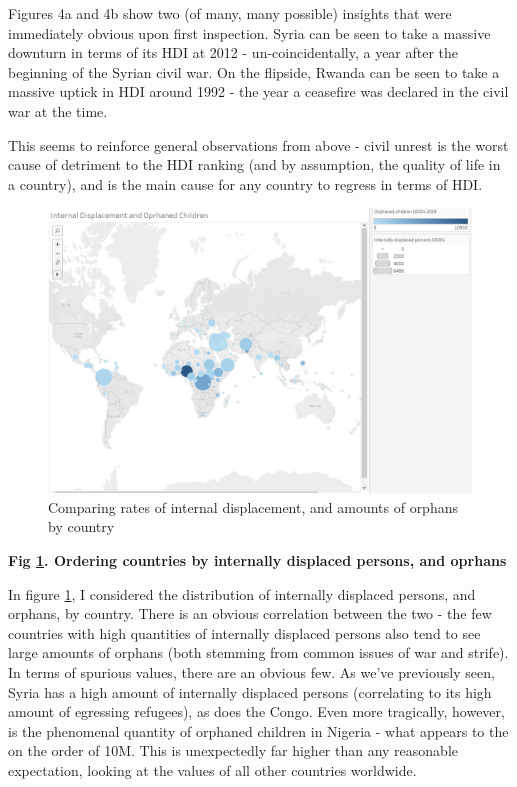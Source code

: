 \documentclass[ 10pt ]{fphw}
\begin{document}
Figures 4a and 4b show two (of many, many possible) insights that were immediately obvious upon first inspection. Syria can be seen to take a massive downturn in terms of its HDI at 2012 - un-coincidentally, a year after the beginning of the Syrian civil war. On the flipside, Rwanda can be seen to take a massive uptick in HDI around 1992 - the year a ceasefire was declared in the civil war at the time. 

This seems to reinforce general observations from above - civil unrest is the worst cause of detriment to the HDI ranking (and by assumption, the quality of life in a country), and is the main cause for any country to regress in terms of HDI.


\hfill \break  

\begin{figure}[H]
    \centering
    \includegraphics[width=\columnwidth]{orphans.PNG} 
    \caption{Comparing rates of internal displacement, and amounts of orphans by country}
    \label{fig:orphans}
\end{figure}

\textbf{Fig \ref{fig:orphans}. Ordering countries by internally displaced persons, and oprhans} 

\vspace{0.25cm}

In figure \ref{fig:orphans}, I considered the distribution of internally displaced persons, and orphans, by country. There is an obvious correlation between the two - the few countries with high quantities of internally displaced persons also tend to see large amounts of orphans (both stemming from common issues of war and strife). In terms of spurious values, there are an obvious few. As we've previously seen, Syria has a high amount of internally displaced persons (correlating to its high amount of egressing refugees), as does the Congo. Even more tragically, however, is the phenomenal quantity of orphaned children in Nigeria - what appears to the on the order of 10M. This is unexpectedly far higher than any reasonable expectation, looking at the values of all other countries worldwide.
\end{document}
